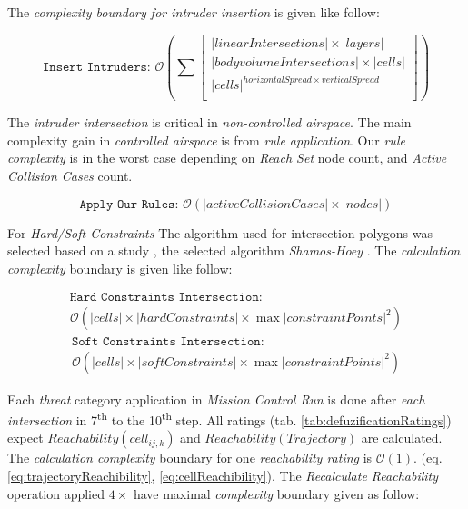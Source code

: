 \noindent The \emph{complexity boundary for \emph{intruder insertion}} is given like follow:

\begin{equation*}
    \texttt{Insert Intruders: }
    \mathscr{O}\left(\sum \begin{bmatrix}
        |linear Intersections| \times |layers|\\
        |body volume Intersections| \times  |cells|\\
        |cells|^{horizontal Spread \times vertical Spread}\\
    \end{bmatrix}\right)
\end{equation*}

\begin{note}
    The \emph{intruder intersection} is critical in \emph{non-controlled airspace}. The main complexity gain in \emph{controlled airspace} is from \emph{rule application}. Our \emph{rule complexity} is in the worst case depending on \emph{Reach Set} node count, and \emph{Active Collision Cases} count.
    
    \begin{equation*}
        \texttt{Apply Our Rules: } \mathscr{O}(|active Collision Cases| \times |nodes|)
    \end{equation*}
\end{note}

\newpage\noindent For \emph{Hard/Soft Constraints} The algorithm used for intersection polygons was selected based on a study \citep{bentley1979algorithms}, the selected algorithm  \emph{Shamos-Hoey} \cite{shamos1976geometric}. The \emph{calculation complexity} boundary is given like follow:

\begin{multline*}
    \texttt{Hard Constraints Intersection:}\\ \mathscr{O}(|cells|\times|hard Constraints| \times \max |constraint Points|^2)
\end{multline*}
\begin{multline*}
    \texttt{Soft Constraints Intersection:}\\ \mathscr{O}(|cells|\times|soft Constraints| \times \max |constraint Points|^2)
\end{multline*}

\noindent Each \emph{threat} category application in \emph{Mission Control Run} is done after \emph{each intersection} in 7\textsuperscript{th} to the  10\textsuperscript{th} step. All ratings (tab. \ref{tab:defuzificationRatings}) expect $Reachability(cell_{ij,k})$ and $Reachability(Trajectory)$  are calculated. The \emph{calculation complexity} boundary for one \emph{reachability rating} is $\mathscr{O}(1)$. (eq. \ref{eq:trajectoryReachibility}, \ref{eq:cellReachibility}). The \emph{Recalculate Reachability} operation applied $4\times$ have maximal \emph{complexity} boundary given as follow:

